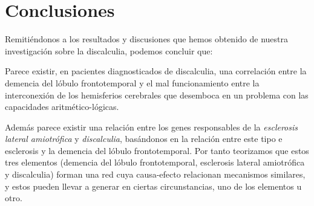 \section{Conclusiones}

\hfill

Remitiéndonos a los resultados y discusiones que hemos obtenido de nuestra investigación sobre la discalculia, podemos concluir que:

\hfill

Parece existir, en pacientes diagnosticados de discalculia, una correlación entre la demencia del lóbulo frontotemporal y el mal funcionamiento entre la interconexión de los hemisferios cerebrales que desemboca en un problema con las capacidades aritmético-lógicas.

\hfill

Además parece existir una relación entre los genes responsables de la \textit{esclerosis lateral amiotrófica} y \textit{discalculia}, basándonos en la relación entre este tipo e esclerosis y la demencia del lóbulo frontotemporal. Por tanto teorizamos que estos tres elementos (demencia del lóbulo frontotemporal, esclerosis lateral amiotrófica y discalculia) forman una red cuya causa-efecto relacionan mecanismos similares, y estos pueden llevar a generar en ciertas circunstancias, uno de los elementos u otro.

